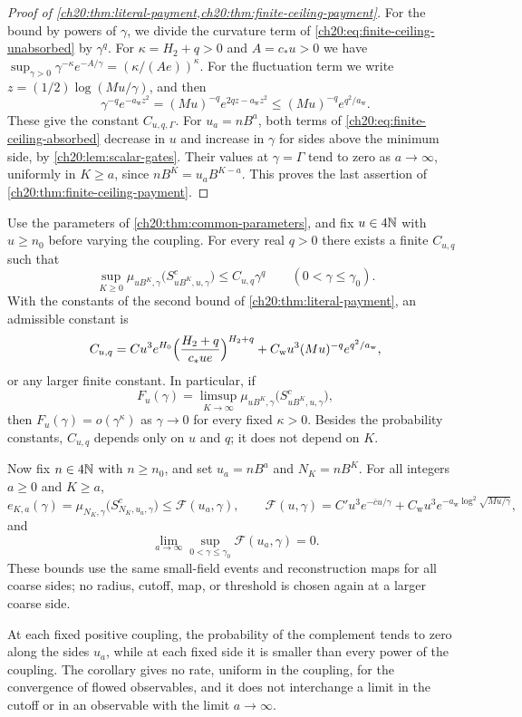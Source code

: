 \begin{proof}[Proof of \cref{ch20:thm:literal-payment,ch20:thm:finite-ceiling-payment}]
For the bound by powers of $\gamma$, we divide the curvature term of \eqref{ch20:eq:finite-ceiling-unabsorbed} by $\gamma^q$. For $\kappa=H_2+q>0$ and $A=c_*u>0$ we have $\sup_{\gamma>0}\gamma^{-\kappa}e^{-A/\gamma}=(\kappa/(Ae))^\kappa$. For the fluctuation term we write $z=(1/2)\log(Mu/\gamma)$, and then
\[
 \gamma^{-q}e^{-a_{\mathrm w}z^2}=(Mu)^{-q}e^{2qz-a_{\mathrm w}z^2}\le(Mu)^{-q}e^{q^2/a_{\mathrm w}}.
\]
These give the constant $C_{u,q,\Gamma}$. For $u_a=nB^a$, both terms of \eqref{ch20:eq:finite-ceiling-absorbed} decrease in $u$ and increase in $\gamma$ for sides above the minimum side, by \cref{ch20:lem:scalar-gates}. Their values at $\gamma=\Gamma$ tend to zero as $a\to\infty$, uniformly in $K\ge a$, since $nB^K=u_aB^{K-a}$. This proves the last assertion of \cref{ch20:thm:finite-ceiling-payment}.
\end{proof}

\begin{corollary}\label{ch20:cor:payment-all-powers}
Use the parameters of \cref{ch20:thm:common-parameters}, and fix $u\in4\mathbb N$ with $u\ge n_0$ before varying the coupling. For every real $q>0$ there exists a finite $C_{u,q}$ such that
\[
 \sup_{K\ge0}\mu_{uB^K,\gamma}\bigl(S_{uB^K,u,\gamma}^c\bigr)\le C_{u,q}\gamma^q\qquad(0<\gamma\le\gamma_0).
\]
With the constants of the second bound of \cref{ch20:thm:literal-payment}, an admissible constant is
\[
 C_{u,q}=Cu^3e^{H_0}\Bigl(\frac{H_2+q}{c_*ue}\Bigr)^{H_2+q}+C_{\mathrm w}u^3(Mu)^{-q}e^{q^2/a_{\mathrm w}},
\]
or any larger finite constant. In particular, if
\[
 F_u(\gamma)=\limsup_{K\to\infty}\mu_{uB^K,\gamma}\bigl(S_{uB^K,u,\gamma}^c\bigr),
\]
then $F_u(\gamma)=o(\gamma^\kappa)$ as $\gamma\to0$ for every fixed $\kappa>0$. Besides the probability constants, $C_{u,q}$ depends only on $u$ and $q$; it does not depend on $K$.

Now fix $n\in4\mathbb N$ with $n\ge n_0$, and set $u_a=nB^a$ and $N_K=nB^K$. For all integers $a\ge0$ and $K\ge a$,
\[
 e_{K,a}(\gamma)=\mu_{N_K,\gamma}\bigl(S_{N_K,u_a,\gamma}^c\bigr)\le\mathcal F(u_a,\gamma),\qquad
 \mathcal F(u,\gamma)=C'u^3e^{-\bar cu/\gamma}+C_{\mathrm w}u^3e^{-a_{\mathrm w}\log^2\sqrt{Mu/\gamma}},
\]
and
\[
 \lim_{a\to\infty}\sup_{0<\gamma\le\gamma_0}\mathcal F(u_a,\gamma)=0.
\]
These bounds use the same small-field events and reconstruction maps for all coarse sides; no radius, cutoff, map, or threshold is chosen again at a larger coarse side.
\end{corollary}

At each fixed positive coupling, the probability of the complement tends to zero along the sides $u_a$, while at each fixed side it is smaller than every power of the coupling. The corollary gives no rate, uniform in the coupling, for the convergence of flowed observables, and it does not interchange a limit in the cutoff or in an observable with the limit $a\to\infty$.

